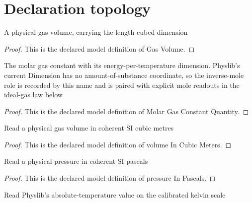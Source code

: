 \section{Declaration topology}
\begin{definition}
  \label{def:physics:phyx-mini-0376:phyxminiproblems-problemphyxmini0376-gasvolume}
  A physical gas volume, carrying the length-cubed dimension
\end{definition}
\begin{proof}
  This is the declared model definition of Gas Volume.
\end{proof}
\begin{definition}
  \label{def:physics:phyx-mini-0376:phyxminiproblems-problemphyxmini0376-molargasconstantquantity}
  The molar gas constant with its energy-per-temperature dimension. Physlib's current Dimension has no amount-of-substance coordinate, so the inverse-mole role is recorded by this name and is paired with explicit mole readouts in the ideal-gas law below
\end{definition}
\begin{proof}
  This is the declared model definition of Molar Gas Constant Quantity.
\end{proof}
\begin{definition}
  \label{def:physics:phyx-mini-0376:phyxminiproblems-problemphyxmini0376-volumeincubicmeters}
  Read a physical gas volume in coherent SI cubic metres
\end{definition}
\begin{proof}
  This is the declared model definition of volume In Cubic Meters.
\end{proof}
\begin{definition}
  \label{def:physics:phyx-mini-0376:phyxminiproblems-problemphyxmini0376-pressureinpascals}
  Read a physical pressure in coherent SI pascals
\end{definition}
\begin{proof}
  This is the declared model definition of pressure In Pascals.
\end{proof}
\begin{definition}
  \label{def:physics:phyx-mini-0376:phyxminiproblems-problemphyxmini0376-temperatureinkelvins}
  Read Physlib's absolute-temperature value on the calibrated kelvin scale
\end{definition}
